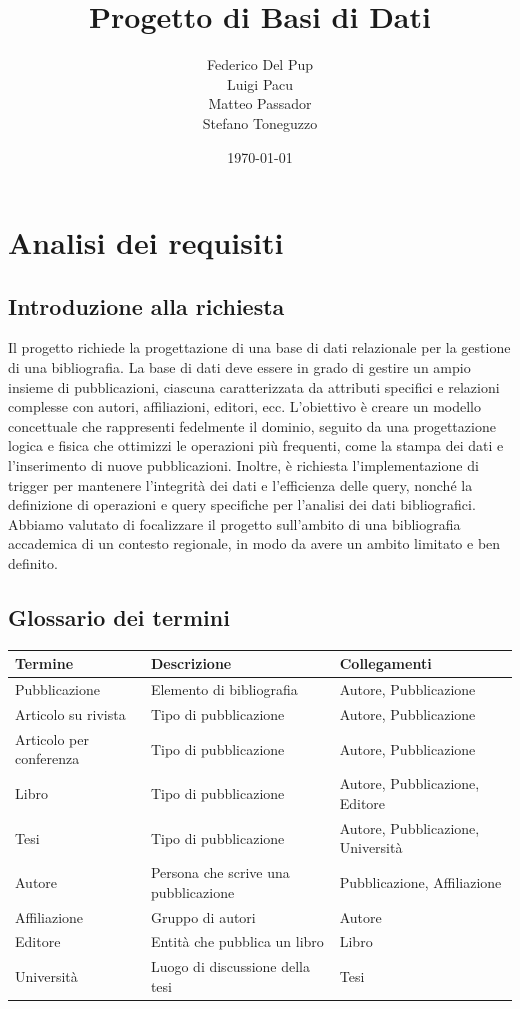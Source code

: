\documentclass[a4paper,12pt]{article}
\title{Progetto di Basi di Dati}
\author{Federico Del Pup \\ Luigi Pa\textcommabelow{s}cu \\ Matteo Passador \\ Stefano Toneguzzo}
\date{\today}
\begin{document}
\tableofcontents

\section{Analisi dei requisiti}
\label{sec:introduzione}
\subsection{Introduzione alla richiesta}
Il progetto richiede la progettazione di una base di dati relazionale per la gestione di una bibliografia. La base di dati deve essere in grado di gestire un ampio insieme di pubblicazioni, ciascuna caratterizzata da attributi specifici e relazioni complesse con autori, affiliazioni, editori, ecc. L'obiettivo è creare un modello concettuale che rappresenti fedelmente il dominio, seguito da una progettazione logica e fisica che ottimizzi le operazioni più frequenti, come la stampa dei dati e l'inserimento di nuove pubblicazioni. Inoltre, è richiesta l'implementazione di trigger per mantenere l'integrità dei dati e l'efficienza delle query, nonché la definizione di operazioni e query specifiche per l'analisi dei dati bibliografici.
\\ Abbiamo valutato di focalizzare il progetto sull'ambito di una bibliografia accademica di un contesto regionale, in modo da avere un ambito limitato e ben definito.

\subsection{Glossario dei termini}
\label{sec:glossario}
\begin{tabularx}{\textwidth}{l X X}
\toprule
\textbf{Termine} & \textbf{Descrizione} & \textbf{Collegamenti} \\
\midrule
Pubblicazione & Elemento di bibliografia & Autore, Pubblicazione \\
Articolo su rivista & Tipo di pubblicazione & Autore, Pubblicazione \\
Articolo per conferenza & Tipo di pubblicazione & Autore, Pubblicazione \\
Libro & Tipo di pubblicazione & Autore, Pubblicazione, Editore \\
Tesi & Tipo di pubblicazione & Autore, Pubblicazione, Università \\
Autore & Persona che scrive una pubblicazione & Pubblicazione, Affiliazione \\
Affiliazione & Gruppo di autori & Autore \\
Editore & Entità che pubblica un libro & Libro \\
Università & Luogo di discussione della tesi & Tesi \\
\bottomrule
\end{tabularx}
\end{document}
